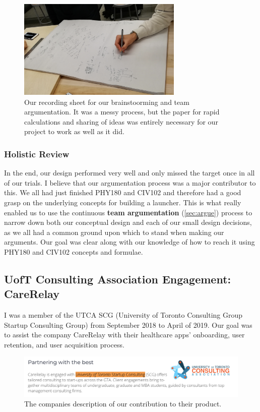 \documentclass[a4paper,12pt]{article}
\begin{document}
\begin{figure}[H]
\centering
\includegraphics[width=0.7\textwidth]{img/image008.png}
\caption{Our recording sheet for our brainstoorming and team argumentation. It was a messy process, but the paper for rapid calculations and sharing of ideas was entirely necessary for our project to work as well as it did.}
\label{}
\end{figure}

\subsubsection{Holistic Review}
In the end, our design performed very well and only missed the target once in all of our trials. I believe that our argumentation process was a major contributor to this. We all had just finished PHY180 and CIV102 and therefore had a good grasp on the underlying concepts for building a launcher. This is what really enabled us to use the continuous \textbf{team argumentation} (\ref{sec:argue}) process to narrow down both our conceptual design and each of our small design decisions, as we all had a common ground upon which to stand when making our arguments. Our goal was clear along with our knowledge of how to reach it using PHY180 and CIV102 concepts and formulae.

\subsection{UofT Consulting Association Engagement: CareRelay}
\label{sec:UTCA}
I was a member of the UTCA SCG (University of Toronto Consulting Group Startup Consulting Group) from September 2018 to April of 2019. Our goal was to assist the company CareRelay with their healthcare apps’ onboarding, user retention, and user acquisition process. 

\begin{figure}[H]
\centering
\includegraphics[width=1\textwidth]{img/image009.png}
\caption{The companies description of our contribution to their product.}
\label{}
\end{figure}
\end{document}
